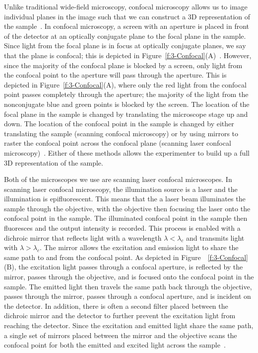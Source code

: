 Unlike traditional wide-field microscopy, confocal microscopy allows us to image individual planes in the image such that we can construct a 3D representation of the sample~\cite{RN260}.
In confocal microscopy, a screen with an aperture is placed in front of the detector at an optically conjugate plane to the focal plane in the sample.
Since light from the focal plane is in focus at optically conjugate planes, we say that the plane is confocal; this is depicted in Figure~\ref{f:3-Confocal}(A)~\cite{RN259}.
However, since the majority of the confocal plane is blocked by a screen, only light from the confocal point to the aperture will pass through the aperture.
This is depicted in Figure~\ref{f:3-Confocal}(A), where only the red light from the confocal point passes completely through the aperture; the majority of the light from the nonconjugate blue and green points is blocked by the screen.
The location of the focal plane in the sample is changed by translating the microscope stage up and down.
The location of the confocal point in the sample is changed by either translating the sample (scanning confocal microscopy) or by using mirrors to raster the confocal point across the confocal plane (scanning laser confocal microscopy)~\cite{RN261,RN262,RN260}.
Either of these methods allows the experimenter to build up a full 3D representation of the sample.

Both of the microscopes we use are scanning laser confocal microscopes.
In scanning laser confocal microscopy, the illumination source is a laser and the illumination is epifluorescent.
This means that the a laser beam illuminates the sample through the objective, with the objective then focusing the laser onto the confocal point in the sample.
The illuminated confocal point in the sample then fluoresces and the output intensity is recorded.
This process is enabled with a dichroic mirror that reflects light with a wavelength $\lambda < \lambda_c$ and transmits light with $\lambda > \lambda_c$.
The mirror allows the excitation and emission light to share the same path to and from the confocal point.
As depicted in Figure~~\ref{f:3-Confocal}(B), the excitation light passes through a confocal aperture, is reflected by the mirror, passes through the objective, and is focused onto the confocal point in the sample.
The emitted light then travels the same path back through the objective, passes through the mirror, passes through a confocal aperture, and is incident on the detector.
In addition, there is often a second filter placed between the dichroic mirror and the detector to further prevent the excitation light from reaching the detector.
Since the excitation and emitted light share the same path, a single set of mirrors placed between the mirror and the objective scans the confocal point for both the emitted and excited light across the sample~\cite{RN260}.

